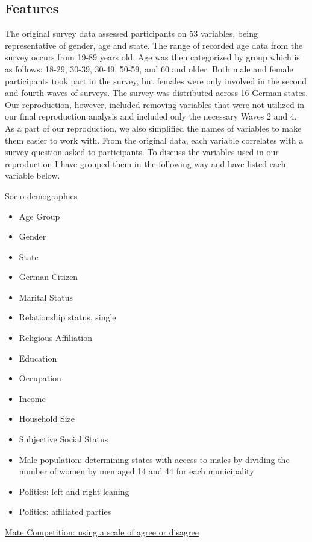 \documentclass[
]{article}
\providecommand{\tightlist}{%
  \setlength{\itemsep}{0pt}\setlength{\parskip}{0pt}}\usepackage{longtable,booktabs,array}
\begin{document}
\hypertarget{features}{%
\subsection{Features}\label{features}}

The original survey data assessed participants on 53 variables, being
representative of gender, age and state. The range of recorded age data
from the survey occurs from 19-89 years old. Age was then categorized by
group which is as follows: 18-29, 30-39, 30-49, 50-59, and 60 and older.
Both male and female participants took part in the survey, but females
were only involved in the second and fourth waves of surveys. The survey
was distributed across 16 German states. Our reproduction, however,
included removing variables that were not utilized in our final
reproduction analysis and included only the necessary Waves 2 and 4. As
a part of our reproduction, we also simplified the names of variables to
make them easier to work with. From the original data, each variable
correlates with a survey question asked to participants. To discuss the
variables used in our reproduction I have grouped them in the following
way and have listed each variable below.

\uline{Socio-demographics}

\begin{itemize}
\tightlist
\item
  Age Group
\item
  Gender
\item
  State
\item
  German Citizen
\item
  Marital Status
\item
  Relationship status, single
\item
  Religious Affiliation
\item
  Education
\item
  Occupation
\item
  Income
\item
  Household Size
\item
  Subjective Social Status
\item
  Male population: determining states with access to males by dividing
  the number of women by men aged 14 and 44 for each municipality
\item
  Politics: left and right-leaning
\item
  Politics: affiliated parties
\end{itemize}

\uline{Mate Competition: using a scale of agree or disagree}
\end{document}
